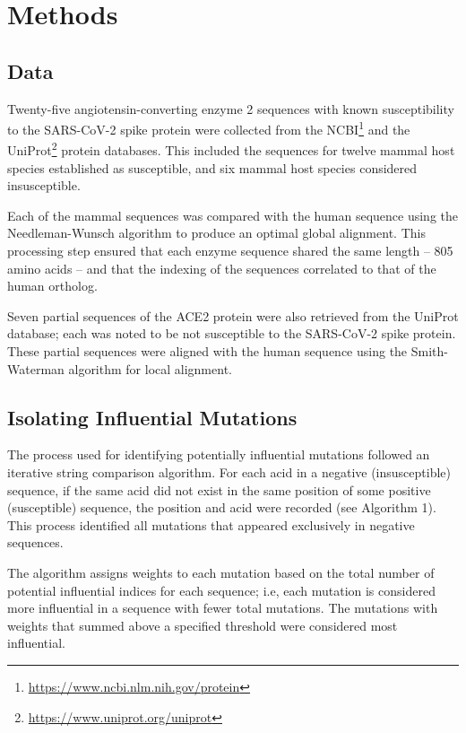 \section{Methods}

\subsection{Data}

Twenty-five angiotensin-converting enzyme 2 sequences with known susceptibility to the SARS-CoV-2 spike protein were collected from the NCBI\footnote{\url{https://www.ncbi.nlm.nih.gov/protein}} and the UniProt\footnote{\url{https://www.uniprot.org/uniprot}} protein databases. This included the sequences for twelve mammal host species established as susceptible, and six mammal host species considered insusceptible.



Each of the mammal sequences was compared with the human sequence using the Needleman-Wunsch algorithm to produce an optimal global alignment. This processing step ensured that each enzyme sequence shared the same length -- 805 amino acids -- and that the indexing of the sequences correlated to that of the human ortholog.

Seven partial sequences of the ACE2 protein were also retrieved from the UniProt database; each was noted to be not susceptible to the SARS-CoV-2 spike protein. These partial sequences were aligned with the human sequence using the Smith-Waterman algorithm for local alignment.

\subsection{Isolating Influential Mutations}

The process used for identifying potentially influential mutations followed an iterative string comparison algorithm. For each acid in a negative (insusceptible) sequence, if the same acid did not exist in the same position of some positive (susceptible) sequence, the position and acid were recorded (see Algorithm 1). This process identified all mutations that appeared exclusively in negative sequences.



The algorithm assigns weights to each mutation based on the total number of potential influential indices for each sequence; i.e, each mutation is considered more influential in a sequence with fewer total mutations. The mutations with weights that summed above a specified threshold were considered most influential.